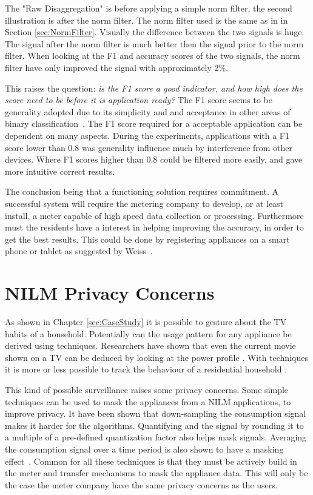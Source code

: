The "Raw Disaggregation" is before applying a simple norm filter, the second illustration is after the norm filter. The norm filter used is the same as in in Section \ref{sec:NormFilter}. Visually the difference between the two signals is huge. The signal after the norm filter is much better then the signal prior to the norm filter. When looking at the F1 and accuracy scores of the two signals, the norm filter have only improved the signal with approximately 2\%.  

This raises the question: \textit{is the F1 score a good indicator, and how high does the score need to be before it is application ready?} The F1 score seems to be generality adopted due to its simplicity and and acceptance in other areas of binary classification~\citep{RefWorks:35}. The F1 score required for a acceptable application can be dependent on many aspects. During the experiments, applications with a F1 score lower than 0.8 was generality influence much by interference from other devices. Where F1 scores higher than 0.8 could be filtered more easily, and gave more intuitive correct results.  

The conclusion being that a functioning  solution requires commitment. A successful system will require the metering company to develop, or at least install, a meter capable of high speed data collection or processing. Furthermore must the residents have a interest in helping improving the accuracy, in order to get the best results. This could be done by registering appliances on a smart phone or tablet as suggested by Weiss~\citep{RefWorks:23}.

\section{NILM Privacy Concerns}
As shown in Chapter \ref{sec:CaseStudy} it is possible to gesture about the TV habits of a household. Potentially can the usage pattern for any appliance be derived using  techniques. Researchers have shown that even the current movie shown on a TV can be deduced by looking at the power profile \citep{RefWorks:39}. With  techniques it is more or less possible to track the behaviour of a residential household \citep{RefWorks:37}.

This kind of possible surveillance raises some privacy concerns. Some simple techniques can be used to mask the appliances from a NILM applications, to improve privacy. It have been shown that down-sampling the consumption signal makes it harder for the  algorithms. Quantifying and the signal by rounding it to a multiple of a pre-defined quantization factor also helps mask signals. Averaging the consumption signal over a time period is also shown to have a masking effect~\citep{RefWorks:40}. Common for all these techniques is that they must be actively build in the meter and transfer mechanisms to mask the appliance data. This will only be the case the meter company have the same privacy concerns as the users. 

